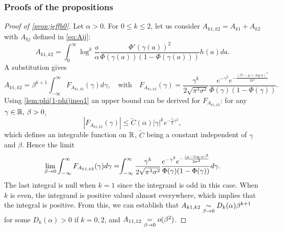 \subsubsection{Proofs of the propositions}
\begin{proof}[Proof of \cref{prop:jeffb0}]
    Let $\alpha>0$. For $0\leq k\leq2$, let us consider $A_{k1,k2}=A_{k1}+A_{k2}$ with $A_{kj}$ defined in \cref{eq:Aij}:
\begin{equation}
    A_{k1,k2} =  \int_{0}^{\infty}\log^k\frac{a}{\alpha}\frac{\Phi'(\gamma(a))^2}{\Phi(\gamma(a))(1-\Phi(\gamma(a)))}h(a)da .
\end{equation}
A substitution gives
    \begin{equation}
        \label{eq:AkAk}
        A_{k1,k2} =   \beta^{k+1}\int_{-\infty}^\infty  F_{A_{k1,k2}}(\gamma)d\gamma , \quad\text{with}\quad
        F_{A_{k1,k2}}(\gamma) =  \frac{\gamma^k}{2\sqrt{\pi^3\sigma^2}} \frac{e^{-\gamma^2}e^{-\frac{(\beta\gamma-\mu+\log\alpha)^2}{2\sigma^2}}}{\Phi(\gamma)(1-\Phi(\gamma))} .
    \end{equation}
Using \cref{lem:phi(1-phi)ineq1} an upper bound can be derived for $F_{A_{k1,k2}}$: for any $\gamma\in\mathbb{R},\,\beta>0$,
\begin{equation}\label{eq:Jasymp:majFkk}
    |F_{A_{k1,k2}}(\gamma)|\leq \tilde C(\alpha)|\gamma|^ke^{-\frac{1}{3}\gamma^2},
\end{equation}
which defines an integrable function on $\mathbb{R}$, $\tilde C$ being a constant independent of $\gamma$ and $\beta$. Hence the limit
\begin{equation}
    \lim_{\beta\rightarrow0}\int_{-\infty}^\infty F_{A_{k1,k2}}(\gamma)d\gamma =\hspace*{-3pt} \int_{-\infty}^\infty \frac{\gamma^k}{2\sqrt{\pi^3\sigma^2}}\frac{e^{-\gamma^2}e^{-\frac{(\mu-\log\alpha)^2}{2\sigma^2}}}{\Phi(\gamma)(1-\Phi(\gamma))}d\gamma.
\end{equation}
{%
The last integral is null when $k=1$ since the integrand is odd in this case.
When $k$ is even, the integrand is positive valued almost everywhere, which implies that the integral is positive. 
From this, we can establish that  $A_{k1,k2}\underset{\beta\rightarrow0}{\sim}D_k(\alpha)\beta^{k+1}$ for some $D_k(\alpha)>0$ if $k=0,2$, and $A_{11,12}\overset{}{\underset{\beta\rightarrow0}{=}}o(\beta^2)$.}


\end{proof}
